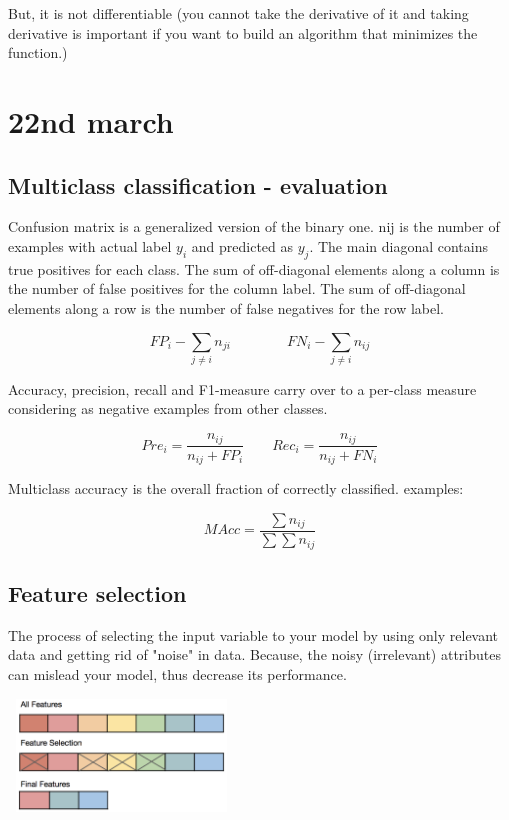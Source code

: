 \documentclass{article}
\begin{document}
But, it is not differentiable (you cannot take the derivative of it and taking derivative is important if you want to build an algorithm that minimizes the function.)

\bigskip

\section*{22nd march}

\subsection*{Multiclass classification - evaluation}
Confusion matrix is a generalized version of the binary one. nij is the number of examples with actual
label \(y_i\) and predicted as \(y_j\). The main diagonal contains true positives for each class. The sum of off-diagonal elements along a column is the number of false positives for the column label. The sum of off-diagonal elements along a row is the number of false negatives for the row label.

\[FP_i - \sum\limits_{j \neq i} n_{ji}\qquad \qquad FN_i - \sum\limits_{j \neq i} n_{ij}\]

Accuracy, precision, recall and F1-measure carry over to a per-class measure considering as negative examples from other classes.

\[Pre_i = \dfrac{n_{ij}}{n_{ij} + FP_i} \qquad Rec_i = \dfrac{n_{ij}}{n_{ij} + FN_i}\]


Multiclass accuracy is the overall fraction of correctly classified. examples:

\[MAcc = \dfrac{\sum n_{ij}}{\sum \sum n_{ij}}\]


\subsection*{Feature selection}


\begin{minipage}{0.45\linewidth}
The process of selecting the input variable to your model by using only relevant data and getting rid of "noise" in data. Because, the noisy (irrelevant) attributes can mislead your model, thus decrease its performance.

\end{minipage}
\hfill
\begin{minipage}{0.45\linewidth}
\includegraphics[width=6cm, height=3cm]{img/task_selct.png}	
\end{minipage}
\end{document}
